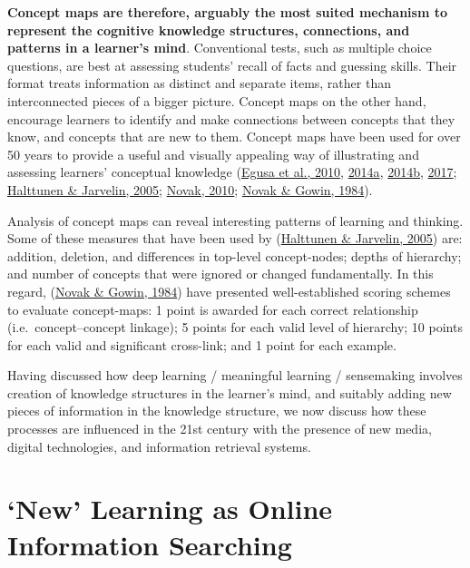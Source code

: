 \documentclass[a4paper, nobind]{templates/ociamthesis}
\begin{document}
\textbf{Concept maps are therefore, arguably the most suited mechanism to
represent the cognitive knowledge structures, connections, and patterns
in a learner's mind}. Conventional tests, such as multiple choice
questions, are best at assessing students' recall of facts and guessing
skills. Their format treats information as distinct and separate items,
rather than interconnected pieces of a bigger picture. Concept maps on
the other hand, encourage learners to identify and make connections
between concepts that they know, and concepts that are new to them.
Concept maps have been used for over 50 years to provide a useful and
visually appealing way of illustrating and assessing learners'
conceptual knowledge
(\protect\hyperlink{ref-egusa2010usingb}{Egusa et al., 2010}, \protect\hyperlink{ref-egusa2014howd}{2014a}, \protect\hyperlink{ref-egusa2014howe}{2014b}, \protect\hyperlink{ref-egusa2017evaluating}{2017}; \protect\hyperlink{ref-halttunen2005assessing}{Halttunen \& Jarvelin, 2005}; \protect\hyperlink{ref-novak2010learninga}{Novak, 2010}; \protect\hyperlink{ref-novak1984learning}{Novak \& Gowin, 1984}).

Analysis of concept maps can reveal interesting patterns of learning and
thinking. Some of these measures that have been used by
(\protect\hyperlink{ref-halttunen2005assessing}{Halttunen \& Jarvelin, 2005}) are: addition, deletion, and differences in
top-level concept-nodes; depths of hierarchy; and number of concepts
that were ignored or changed fundamentally. In this regard,
(\protect\hyperlink{ref-novak1984learning}{Novak \& Gowin, 1984}) have presented well-established scoring schemes to
evaluate concept-maps: 1 point is awarded for each correct relationship
(i.e.~concept--concept linkage); 5 points for each valid level of
hierarchy; 10 points for each valid and significant cross-link; and 1
point for each example.

Having discussed how deep learning / meaningful learning / sensemaking
involves creation of knowledge structures in the learner's mind, and
suitably adding new pieces of information in the knowledge structure, we
now discuss how these processes are influenced in the 21st century with
the presence of new media, digital technologies, and information
retrieval systems.

\hypertarget{sec:bg_learn_active_knowledge_multiliteracy}{%
\section{`New' Learning as Online Information Searching}\label{sec:bg_learn_active_knowledge_multiliteracy}}
\end{document}
